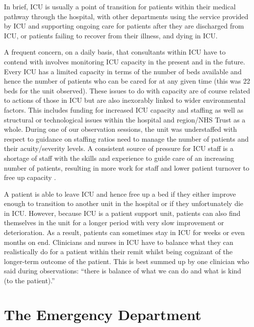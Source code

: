 \documentclass[a4paper, nobind]{templates/ociamthesis}
\begin{document}
\hfill\break
In brief, ICU is usually a point of transition for patients within their medical pathway through the hospital, with other departments using the service provided by ICU and supporting ongoing care for patients after they are discharged from ICU, or patients failing to recover from their illness, and dying in ICU.

\hfill\break
A frequent concern, on a daily basis, that consultants within ICU have to contend with involves monitoring ICU capacity in the present and in the future. Every ICU has a limited capacity in terms of the number of beds available and hence the number of patients who can be cared for at any given time (this was 22 beds for the unit observed). These issues to do with capacity are of course related to actions of those in ICU but are also inexorably linked to wider environmental factors. This includes funding for increased ICU capacity and staffing as well as structural or technological issues within the hospital and region/NHS Trust as a whole. During one of our observation sessions, the unit was understaffed with respect to guidance on staffing ratios need to manage the number of patients and their acuity/severity levels. A consistent source of pressure for ICU staff is a shortage of staff with the skills and experience to guide care of an increasing number of patients, resulting in more work for staff and lower patient turnover to free up capacity \autocite{page_strategies_2024}.

\hfill\break
A patient is able to leave ICU and hence free up a bed if they either improve enough to transition to another unit in the hospital or if they unfortunately die in ICU. However, because ICU is a patient support unit, patients can also find themselves in the unit for a longer period with very slow improvement or deterioration. As a result, patients can sometimes stay in ICU for weeks or even months on end. Clinicians and nurses in ICU have to balance what they can realistically do for a patient within their remit whilst being cognizant of the longer-term outcome of the patient. This is best summed up by one clinician who said during observations: ``there is balance of what we can do and what is kind (to the patient).''

\section*{The Emergency Department}\label{the-emergency-department}
\end{document}
